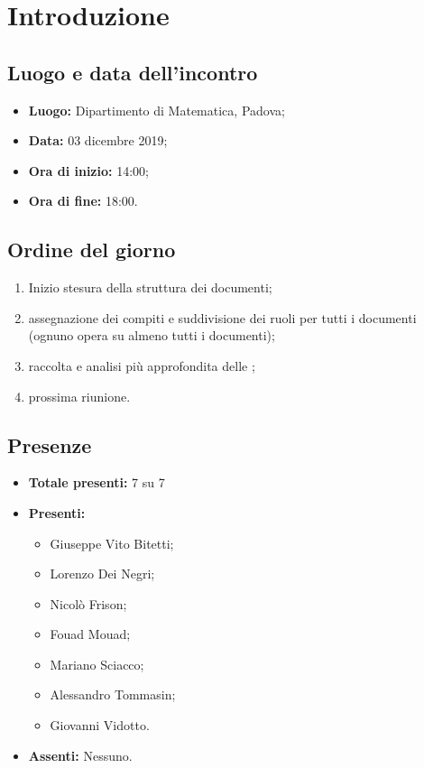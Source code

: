 \section*{Introduzione}

\subsection*{Luogo e data dell'incontro}
	\begin{itemize}
		\item \textbf{Luogo:} Dipartimento di Matematica, Padova;
		\item \textbf{Data:} 03 dicembre 2019;
		\item \textbf{Ora di inizio:} 14:00;
		\item \textbf{Ora di fine:} 18:00.
	\end{itemize}

\subsection*{Ordine del giorno}
	\begin{enumerate}
		\item Inizio stesura della struttura dei documenti;
		\item assegnazione dei compiti e suddivisione dei ruoli per tutti i documenti (ognuno opera su almeno tutti i documenti);
		\item raccolta e analisi più approfondita delle {\dext};
		\item prossima riunione.
	\end{enumerate}

\subsection*{Presenze}
	\begin{itemize}
		\item \textbf{Totale presenti:} 7 su 7
		\item \textbf{Presenti: }
			\begin{itemize}
				\item Giuseppe Vito Bitetti;
				\item Lorenzo Dei Negri;
				\item Nicolò Frison;
				\item Fouad Mouad;
				\item Mariano Sciacco;
				\item Alessandro Tommasin;
				\item Giovanni Vidotto.
			\end{itemize}
		\item \textbf{Assenti: }
			Nessuno.
	\end{itemize}


